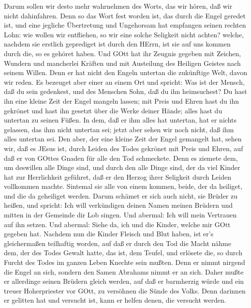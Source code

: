  Darum sollen wir desto mehr wahrnehmen des Worts, das wir
hören, daß wir nicht dahinfahren.  Denn so das Wort fest
worden ist, das durch die Engel geredet ist, und eine jegliche
Übertretung und Ungehorsam hat empfangen seinen rechten Lohn:
 wie wollen wir entfliehen, so wir eine solche Seligkeit
nicht achten? welche, nachdem sie erstlich geprediget ist durch den
HErrn, ist sie auf uns kommen durch die, so es gehöret haben.
 Und GOtt hat ihr Zeugnis gegeben mit Zeichen, Wundern und
mancherlei Kräften und mit Austeilung des Heiligen Geistes nach seinem
Willen.  Denn er hat nicht den Engeln untertan die
zukünftige Welt, davon wir reden.  Es bezeuget aber einer an
einem Ort und spricht: Was ist der Mensch, daß du sein gedenkest, und
des Menschen Sohn, daß du ihn heimsuchest?  Du hast ihn eine
kleine Zeit der Engel mangeln lassen; mit Preis und Ehren hast du ihn
gekrönet und hast ihn gesetzt über die Werke deiner Hände; 
alles hast du untertan zu seinen Füßen. In dem, daß er ihm alles hat
untertan, hat er nichts gelassen, das ihm nicht untertan sei; jetzt aber
sehen wir noch nicht, daß ihm alles untertan sei.  Den aber,
der eine kleine Zeit der Engel gemangelt hat, sehen wir, daß es JEsus
ist, durch Leiden des Todes gekrönet mit Preis und Ehren, auf daß er von
GOttes Gnaden für alle den Tod schmeckete.  Denn es ziemete
dem, um deswillen alle Dinge sind, und durch den alle Dinge sind, der da
viel Kinder hat zur Herrlichkeit geführet, daß er den Herzog ihrer
Seligkeit durch Leiden vollkommen machte.  Sintemal sie
alle von einem kommen, beide, der da heiliget, und die da geheiliget
werden. Darum schämet er sich auch nicht, sie Brüder zu heißen,
 und spricht: Ich will verkündigen deinen Namen meinen
Brüdern und mitten in der Gemeinde dir Lob singen.  Und
abermal: Ich will mein Vertrauen auf ihn setzen. Und abermal: Siehe da,
ich und die Kinder, welche mir GOtt gegeben hat.  Nachdem
nun die Kinder Fleisch und Blut haben, ist er's gleichermaßen teilhaftig
worden, auf daß er durch den Tod die Macht nähme dem, der des Todes
Gewalt hatte, das ist, dem Teufel,  und erlösete die, so
durch Furcht des Todes im ganzen Leben Knechte sein mußten.
 Denn er nimmt nirgend die Engel an sich, sondern den Samen
Abrahams nimmt er an sich.  Daher mußte er allerdinge
seinen Brüdern gleich werden, auf daß er barmherzig würde und ein treuer
Hoherpriester vor GOtt, zu versöhnen die Sünde des Volks. 
Denn darinnen er gelitten hat und versucht ist, kann er helfen denen,
die versucht werden.

